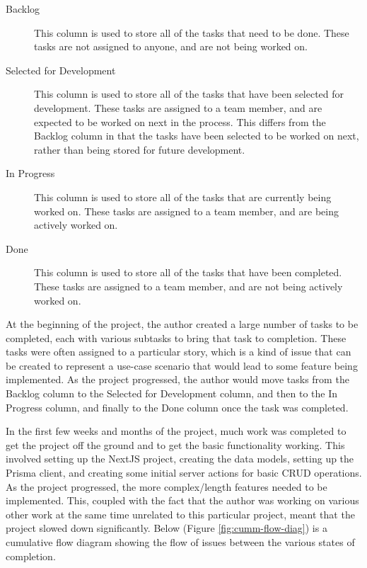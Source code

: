 \documentclass[11pt, a4paper,twoside]{report}
\theoremstyle{plain} %
\theoremstyle{definition} %
\numberwithin{equation}{chapter}
\begin{document}
\begin{description}
    \item[Backlog] {
        This column is used to store all of the tasks that need to be done.
        These tasks are not assigned to anyone, and are not being worked on.
        }
    \item[Selected for Development] {
        This column is used to store all of the tasks that have been selected
        for development. These tasks are assigned to a team member, and are
        expected to be worked on next in the process. This differs from the
        Backlog column in that the tasks have been selected to be worked on
        next, rather than being stored for future development.
        }
    \item[In Progress] {
        This column is used to store all of the tasks that are currently being
        worked on. These tasks are assigned to a team member, and are being
        actively worked on.
        }
    \item[Done] {
        This column is used to store all of the tasks that have been completed.
        These tasks are assigned to a team member, and are not being actively
        worked on.
        }
\end{description}

At the beginning of the project, the author created a large number of tasks
to be completed, each with various subtasks to bring that task to completion.
These tasks were often assigned to a particular story, which is a kind of issue
that can be created to represent a use-case scenario that would lead to some
feature being implemented. As the project progressed, the author would move
tasks from the Backlog column to the Selected for Development column, and then
to the In Progress column, and finally to the Done column once the task was
completed.

In the first few weeks and months of the project, much work was completed to
get the project off the ground and to get the basic functionality working. This
involved setting up the NextJS project, creating the data models, setting up
the Prisma client, and creating some initial server actions for basic CRUD
operations. As the project progressed, the more complex/length features needed
to be implemented. This, coupled with the fact that the author was working on
various other work at the same time unrelated to this particular project, meant
that the project slowed down significantly. Below (Figure
\ref{fig:cumm-flow-diag}) is a cumulative flow diagram showing the flow of
issues between the various states of completion.
\end{document}
